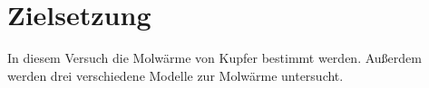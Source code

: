 \section{Zielsetzung}
\label{sec:zielsetzung}
In diesem Versuch die Molwärme von Kupfer bestimmt werden. Außerdem werden drei verschiedene Modelle zur Molwärme untersucht.
